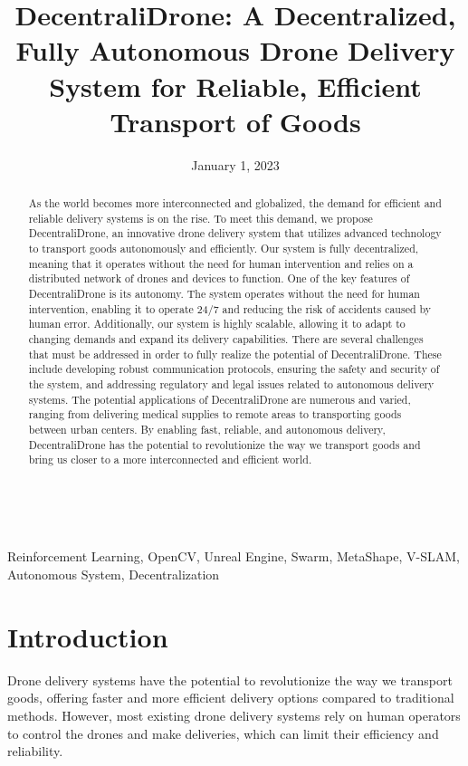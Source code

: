 \documentclass[conference]{IEEEtran}
\title{DecentraliDrone: A Decentralized, Fully Autonomous Drone Delivery System for Reliable, Efficient Transport of Goods}
\author{
\IEEEauthorblockN{Abdul Aziz A.B}
\IEEEauthorblockA{abdulaziz.ahamed2020@vitstudent.ac.in}
\IEEEauthorblockT{VIT University}

\and

\IEEEauthorblockN{Dhairya Gupta}
\IEEEauthorblockA{dhairya.g2020@vitstudent.ac.in}
\IEEEauthorblockT{VIT University}

\and

\IEEEauthorblockN{Samik Saraswat}
\IEEEauthorblockA{samik.saraswat2020@vitstudent.ac.in}
\IEEEauthorblockT{VIT University}
}
\date{January 1, 2023}
\begin{document}
\maketitle

\begin{abstract}
As the world becomes more interconnected and globalized, the demand for efficient and reliable delivery systems is on the rise. To meet this demand, we propose DecentraliDrone, an innovative drone delivery system that utilizes advanced technology to transport goods autonomously and efficiently. Our system is fully decentralized, meaning that it operates without the need for human intervention and relies on a distributed network of drones and devices to function. One of the key features of DecentraliDrone is its autonomy. The system operates without the need for human intervention, enabling it to operate 24/7 and reducing the risk of accidents caused by human error. Additionally, our system is highly scalable, allowing it to adapt to changing demands and expand its delivery capabilities.
There are several challenges that must be addressed in order to fully realize the potential of DecentraliDrone. These include developing robust communication protocols, ensuring the safety and security of the system, and addressing regulatory and legal issues related to autonomous delivery systems.
The potential applications of DecentraliDrone are numerous and varied, ranging from delivering medical supplies to remote areas to transporting goods between urban centers. By enabling fast, reliable, and autonomous delivery, DecentraliDrone has the potential to revolutionize the way we transport goods and bring us closer to a more interconnected and efficient world.

\end{abstract}\\

\begin{IEEEkeywords}
Reinforcement Learning, OpenCV, Unreal Engine, Swarm, MetaShape, V-SLAM, Autonomous System, Decentralization
\end{IEEEkeywords}

\section{Introduction}
Drone delivery systems have the potential to revolutionize the way we transport goods, offering faster and more efficient delivery options compared to traditional methods. However, most existing drone delivery systems rely on human operators to control the drones and make deliveries, which can limit their efficiency and reliability.
\end{document}
